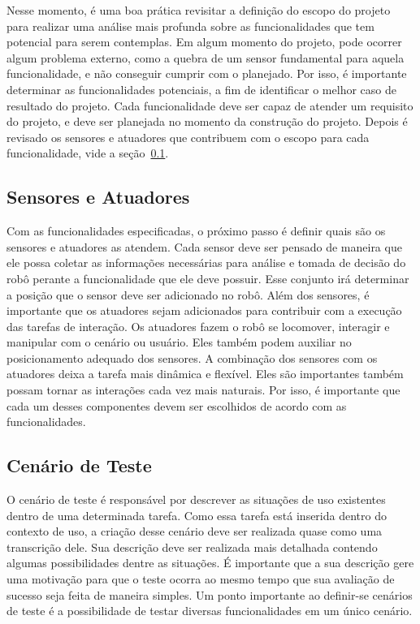 Nesse momento, é uma boa prática revisitar a definição do escopo do projeto para realizar uma análise mais profunda sobre as funcionalidades que tem potencial para serem contemplas. Em algum momento do projeto, pode ocorrer algum problema externo, como a quebra de um sensor fundamental para aquela funcionalidade, e não conseguir cumprir com o planejado. Por isso, é importante determinar as funcionalidades potenciais, a fim de identificar o melhor caso de resultado do projeto. Cada funcionalidade deve ser capaz de atender um requisito do projeto, e deve ser planejada no momento da construção do projeto. Depois é revisado os sensores e atuadores que contribuem com o escopo para cada funcionalidade, vide a seção~\ref{sec:sensoresatuadores}.

\subsection{Sensores e Atuadores}
\label{sec:sensoresatuadores} 
Com as funcionalidades especificadas, o próximo passo é definir quais são os sensores e atuadores as atendem. Cada sensor deve ser pensado de maneira que ele possa coletar as informações necessárias para análise e tomada de decisão do robô perante a funcionalidade que ele deve possuir. Esse conjunto irá determinar a posição que o sensor deve ser adicionado no robô. Além dos sensores, é importante que os atuadores sejam adicionados para contribuir com a execução das tarefas de interação. Os atuadores fazem o robô se locomover, interagir e manipular com o cenário ou usuário. Eles também podem auxiliar no posicionamento adequado dos sensores. A combinação dos sensores com os atuadores deixa a tarefa mais dinâmica e flexível. Eles são importantes também possam tornar as interações cada vez mais naturais. Por isso, é importante que cada um desses componentes devem ser escolhidos de acordo com as funcionalidades.

\subsection{Cenário de Teste}
\label{sec:cenarioteste}
O cenário de teste é responsável por descrever as situações de uso existentes dentro de uma determinada tarefa. Como essa tarefa está inserida dentro do contexto de uso, a criação desse cenário deve ser realizada quase como uma transcrição dele. Sua descrição deve ser realizada mais detalhada contendo algumas possibilidades dentre as situações. É importante que a sua descrição gere uma motivação para que o teste ocorra ao mesmo tempo que sua avaliação de sucesso seja feita de maneira simples. Um ponto importante ao definir-se cenários de teste é a possibilidade de testar diversas funcionalidades em um único cenário. 


